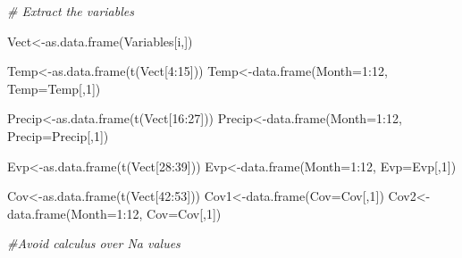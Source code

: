 \documentclass[
  10pt,
  b5paper,
]{book}
\newenvironment{Shaded}{\begin{snugshade}}{\end{snugshade}}
\newcommand{\AttributeTok}[1]{\textcolor[rgb]{0.77,0.63,0.00}{#1}}
\newcommand{\CommentTok}[1]{\textcolor[rgb]{0.56,0.35,0.01}{\textit{#1}}}
\newcommand{\DecValTok}[1]{\textcolor[rgb]{0.00,0.00,0.81}{#1}}
\newcommand{\FunctionTok}[1]{\textcolor[rgb]{0.00,0.00,0.00}{#1}}
\newcommand{\NormalTok}[1]{#1}
\newcommand{\OtherTok}[1]{\textcolor[rgb]{0.56,0.35,0.01}{#1}}
\newcommand{\SpecialCharTok}[1]{\textcolor[rgb]{0.00,0.00,0.00}{#1}}
\begin{document}
\begin{Shaded}
\begin{Highlighting}[]
\CommentTok{\# Extract the variables }

\NormalTok{Vect}\OtherTok{\textless{}{-}}\FunctionTok{as.data.frame}\NormalTok{(Variables[i,])}

\NormalTok{Temp}\OtherTok{\textless{}{-}}\FunctionTok{as.data.frame}\NormalTok{(}\FunctionTok{t}\NormalTok{(Vect[}\DecValTok{4}\SpecialCharTok{:}\DecValTok{15}\NormalTok{]))}
\NormalTok{Temp}\OtherTok{\textless{}{-}}\FunctionTok{data.frame}\NormalTok{(}\AttributeTok{Month=}\DecValTok{1}\SpecialCharTok{:}\DecValTok{12}\NormalTok{, }\AttributeTok{Temp=}\NormalTok{Temp[,}\DecValTok{1}\NormalTok{])}

\NormalTok{Precip}\OtherTok{\textless{}{-}}\FunctionTok{as.data.frame}\NormalTok{(}\FunctionTok{t}\NormalTok{(Vect[}\DecValTok{16}\SpecialCharTok{:}\DecValTok{27}\NormalTok{]))}
\NormalTok{Precip}\OtherTok{\textless{}{-}}\FunctionTok{data.frame}\NormalTok{(}\AttributeTok{Month=}\DecValTok{1}\SpecialCharTok{:}\DecValTok{12}\NormalTok{, }\AttributeTok{Precip=}\NormalTok{Precip[,}\DecValTok{1}\NormalTok{])}

\NormalTok{Evp}\OtherTok{\textless{}{-}}\FunctionTok{as.data.frame}\NormalTok{(}\FunctionTok{t}\NormalTok{(Vect[}\DecValTok{28}\SpecialCharTok{:}\DecValTok{39}\NormalTok{]))}
\NormalTok{Evp}\OtherTok{\textless{}{-}}\FunctionTok{data.frame}\NormalTok{(}\AttributeTok{Month=}\DecValTok{1}\SpecialCharTok{:}\DecValTok{12}\NormalTok{, }\AttributeTok{Evp=}\NormalTok{Evp[,}\DecValTok{1}\NormalTok{])}
    
\NormalTok{Cov}\OtherTok{\textless{}{-}}\FunctionTok{as.data.frame}\NormalTok{(}\FunctionTok{t}\NormalTok{(Vect[}\DecValTok{42}\SpecialCharTok{:}\DecValTok{53}\NormalTok{]))}
\NormalTok{Cov1}\OtherTok{\textless{}{-}}\FunctionTok{data.frame}\NormalTok{(}\AttributeTok{Cov=}\NormalTok{Cov[,}\DecValTok{1}\NormalTok{])}
\NormalTok{Cov2}\OtherTok{\textless{}{-}}\FunctionTok{data.frame}\NormalTok{(}\AttributeTok{Month=}\DecValTok{1}\SpecialCharTok{:}\DecValTok{12}\NormalTok{, }\AttributeTok{Cov=}\NormalTok{Cov[,}\DecValTok{1}\NormalTok{])}

\CommentTok{\#Avoid calculus over Na values }


\end{Highlighting}
\end{Shaded}
\end{document}
